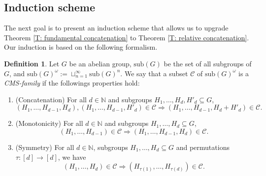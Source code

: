 \documentclass[11pt]{amsart}
\theoremstyle{definition}
\newtheorem{definition}[lemma]{Definition}
\newcommand{\1}{{\mathbf{1}}}
\begin{document}
\subsection{Induction scheme}

The next goal is to present an induction scheme that allows us to upgrade Theorem \ref{T: fundamental concatenation} to Theorem \ref{T: relative concatenation}. Our induction is based on the following formalism.
\begin{definition}\label{D: CIS}
   Let $G$ be an abelian group, $\text{sub}(G)$ be the set of all subgroups of $G$, and $\text{sub}(G)^{\omega}:=\sqcup_{n=1}^{\infty}\text{sub}(G)^{n}$. We say that a subset $\mathcal{C}$ of $\text{sub}(G)^{\omega}$ is a \emph{CMS-family} if the followings properties hold:
   \begin{enumerate}
 		\item (Concatenation) For all $d\in\mathbb{N}$ and subgroups $H_{1},\dots,H_{d},H'_{d}\subseteq G$,
 		$$(H_{1},\dots,H_{d-1},H_{d}), (H_{1},\dots,H_{d-1},H'_{d})\in \mathcal{C}\Rightarrow (H_{1},\dots,H_{d-1},H_{d}+H'_{d})\in \mathcal{C}.$$
 		\item (Monotonicity) For all $d\in\mathbb{N}$ and subgroups $H_{1},\dots,H_{d}\subseteq G$,  
 		$$(H_{1},\dots,H_{d-1})\in \mathcal{C}\Rightarrow (H_{1},\dots,H_{d-1},H_{d})\in \mathcal{C}.$$
 		\item (Symmetry) For all $d\in\mathbb{N}$, subgroups $H_{1},\dots,H_{d}\subseteq G$ and permutations $\tau:[d]\to[d]$, we have
 		$$(H_{1},\dots,H_{d})\in \mathcal{C}\Rightarrow (H_{\tau(1)},\dots,H_{\tau(d)})\in \mathcal{C}.$$
 	\end{enumerate}
\end{definition}
\end{document}
